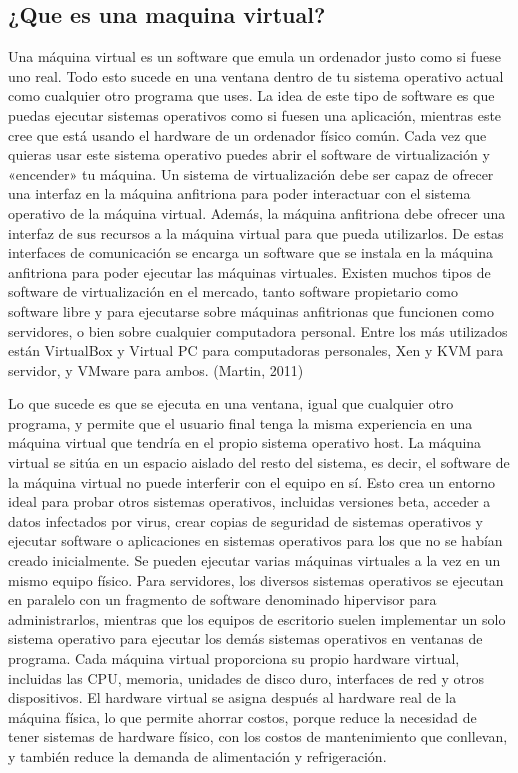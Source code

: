 \documentclass[twoside,twocolumn]{article}
\begin{document}
\subsection{¿Que es una maquina virtual?}

Una máquina virtual es un software que emula un ordenador justo como si fuese uno real. Todo esto sucede en una ventana dentro de tu sistema operativo actual como cualquier otro programa que uses. La idea de este tipo de software es que puedas ejecutar sistemas operativos como si fuesen una aplicación, mientras este cree que está usando el hardware de un ordenador físico común. Cada vez que quieras usar este sistema operativo puedes abrir el software de virtualización y «encender» tu máquina.
Un sistema de virtualización debe ser capaz de ofrecer una interfaz en la máquina anfitriona para poder interactuar con el sistema operativo de la máquina virtual. Además, la máquina anfitriona debe ofrecer una interfaz de sus recursos a la máquina virtual para que pueda utilizarlos. De estas interfaces de comunicación se encarga un software que se instala en la máquina anfitriona para poder ejecutar las máquinas virtuales. Existen muchos tipos de software de virtualización en el mercado, tanto software propietario como software libre y para ejecutarse sobre máquinas anfitrionas que funcionen como servidores, o bien sobre cualquier computadora personal. Entre los más utilizados están VirtualBox y Virtual PC para computadoras personales, Xen y KVM para servidor, y VMware para ambos. (Martin, 2011)

Lo que sucede es que se ejecuta en una ventana, igual que cualquier otro programa, y permite que el usuario final tenga la misma experiencia en una máquina virtual que tendría en el propio sistema operativo host. La máquina virtual se sitúa en un espacio aislado del resto del sistema, es decir, el software de la máquina virtual no puede interferir con el equipo en sí. Esto crea un entorno ideal para probar otros sistemas operativos, incluidas versiones beta, acceder a datos infectados por virus, crear copias de seguridad de sistemas operativos y ejecutar software o aplicaciones en sistemas operativos para los que no se habían creado inicialmente.
Se pueden ejecutar varias máquinas virtuales a la vez en un mismo equipo físico. Para servidores, los diversos sistemas operativos se ejecutan en paralelo con un fragmento de software denominado hipervisor para administrarlos, mientras que los equipos de escritorio suelen implementar un solo sistema operativo para ejecutar los demás sistemas operativos en ventanas de programa. Cada máquina virtual proporciona su propio hardware virtual, incluidas las CPU, memoria, unidades de disco duro, interfaces de red y otros dispositivos. El hardware virtual se asigna después al hardware real de la máquina física, lo que permite ahorrar costos, porque reduce la necesidad de tener sistemas de hardware físico, con los costos de mantenimiento que conllevan, y también reduce la demanda de alimentación y refrigeración.
\end{document}
